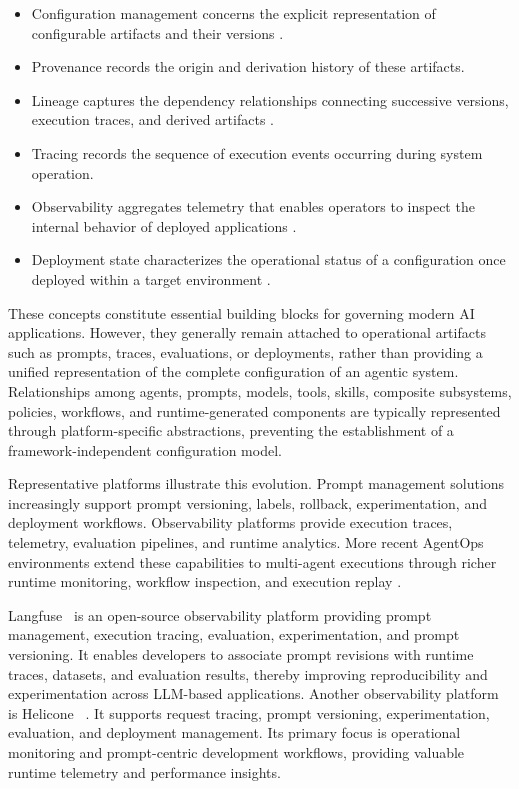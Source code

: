 \documentclass[10pt]{article}
\begin{document}
\begin{itemize}
	\item Configuration management concerns the explicit representation of configurable artifacts and their versions \cite{liu2025towards, Hughes03072025, langfusedocs, heliconedocs}. 
	\item Provenance records the origin and derivation history of these artifacts.
	\item Lineage captures the dependency relationships connecting successive versions, execution traces, and derived artifacts \cite{cesarano2026grand, rajath2025review}. 
	\item Tracing records the sequence of execution events occurring during system operation.
	\item Observability \cite{langsmithdocs} aggregates telemetry that enables operators to inspect the internal behavior of deployed applications \cite{opentelemetry}. 
	\item Deployment state characterizes the operational status of a configuration once deployed within a target environment \cite{braintrustdocs}.
\end{itemize}	

These concepts constitute essential building blocks for governing modern AI applications. However, they generally remain attached to operational artifacts such as prompts, traces, evaluations, or deployments, rather than providing a unified representation of the complete configuration of an agentic system. Relationships among agents, prompts, models, tools, skills, composite subsystems, policies, workflows, and runtime-generated components are typically represented through platform-specific abstractions, preventing the establishment of a framework-independent configuration model.

Representative platforms illustrate this evolution. Prompt management solutions increasingly support prompt versioning, labels, rollback, experimentation, and deployment workflows. Observability platforms provide execution traces, telemetry, evaluation pipelines, and runtime analytics. More recent AgentOps environments extend these capabilities to multi-agent executions through richer runtime monitoring, workflow inspection, and execution replay \cite{sahir2026agentops}. 

Langfuse~\cite{langfusedocs} is an open-source observability platform providing prompt management, execution tracing, evaluation, experimentation, and prompt versioning. It enables developers to associate prompt revisions with runtime traces, datasets, and evaluation results, thereby improving reproducibility and
experimentation across LLM-based applications.
Another observability platform is Helicone ~\cite{heliconedocs}. It supports request tracing, prompt versioning, experimentation, evaluation, and deployment management. Its primary focus is operational monitoring and prompt-centric development workflows, providing valuable runtime telemetry and performance insights. 
\end{document}
